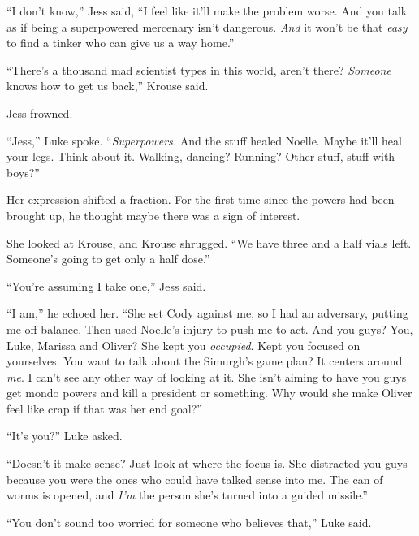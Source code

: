 ``I don't know,'' Jess said, ``I feel like it'll make the problem worse.  And you talk as if being a superpowered mercenary isn't dangerous.  \emph{And} it won't be that \emph{easy} to find a tinker who can give us a way home.''



``There's a thousand mad scientist types in this world, aren't there?  \emph{Someone} knows how to get us back,'' Krouse said.



Jess frowned.



``Jess,'' Luke spoke.  ``\emph{Superpowers.  }And the stuff healed Noelle.  Maybe it'll heal your legs.  Think about it.  Walking, dancing?  Running?  Other stuff, stuff with boys?''



Her expression shifted a fraction.  For the first time since the powers had been brought up, he thought maybe there was a sign of interest.



She looked at Krouse, and Krouse shrugged.  ``We have three and a half vials left.  Someone's going to get only a half dose.''



``You're assuming I take one,'' Jess said.



``I am,'' he echoed her.  ``She set Cody against me, so I had an adversary, putting me off balance.  Then used Noelle's injury to push me to act.  And you guys?  You, Luke, Marissa and Oliver?  She kept you \emph{occupied}.  Kept you focused on yourselves.  You want to talk about the Simurgh's game plan?  It centers around \emph{me}.  I can't see any other way of looking at it.  She isn't aiming to have you guys get mondo powers and kill a president or something.  Why would she make Oliver feel like crap if that was her end goal?''



``It's you?'' Luke asked.



``Doesn't it make sense?  Just look at where the focus is.  She distracted you guys because you were the ones who could have talked sense into me.  The can of worms is opened, and \emph{I'm} the person she's turned into a guided missile.''



``You don't sound too worried for someone who believes that,'' Luke said.



